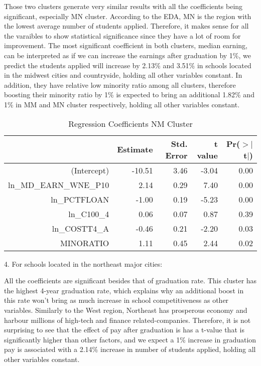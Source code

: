 \documentclass{article}
\begin{document}
Those two clusters generate very similar results with all the coefficients being significant, especially MN cluster. According to the EDA, MN is the region with the lowest average number of students applied. Therefore, it makes sense for all the varaibles to show statistical significance since they have a lot of room for improvement. The most significant coefficient in both clusters, median earning, can be interpreted as if we can increase the earnings after graduation by 1\%, we predict the students applied will increase by 2.13\% and 3.51\% in schools located in the midwest cities and countryside, holding all other variables constant. In addition, they have relative low minority ratio among all clusters, therefore boosting their minority ratio by 1\% is expected to bring an additional 1.82\% and 1\% in MM and MN cluster respectively, holding all other variables constant.


\begin{Schunk}
\begin{Soutput}
\begin{table}[H]
\centering
\begin{tabular}{rrrrr}
  \hline
 & Estimate & Std. Error & t value & Pr($>$$|$t$|$) \\ 
  \hline
(Intercept) & -10.51 & 3.46 & -3.04 & 0.00 \\ 
  ln\_MD\_EARN\_WNE\_P10 & 2.14 & 0.29 & 7.40 & 0.00 \\ 
  ln\_PCTFLOAN & -1.00 & 0.19 & -5.23 & 0.00 \\ 
  ln\_C100\_4 & 0.06 & 0.07 & 0.87 & 0.39 \\ 
  ln\_COSTT4\_A & -0.46 & 0.21 & -2.20 & 0.03 \\ 
  MINORATIO & 1.11 & 0.45 & 2.44 & 0.02 \\ 
   \hline
\end{tabular}
\caption{Regression Coefficients NM Cluster} 
\end{table}
\end{Soutput}
\end{Schunk}

4. For schools located in the northeast major cities:

All the coefficients are significant besides that of graduation rate. This cluster has the highest 4-year graduation rate, which explains why an additional boost in this rate won't bring as much increase in school competitiveness as other variables. Similarly to the West region, Northeast has prosperous economy and harbour millions of high-tech and finance related-companies. Therefore, it is not surprising to see that the effect of pay after graduation is has a t-value that is significantly higher than other factors, and we expect a 1\% increase in graduation pay is associated with a 2.14\% increase in number of students applied, holding all other variables constant.
\end{document}
